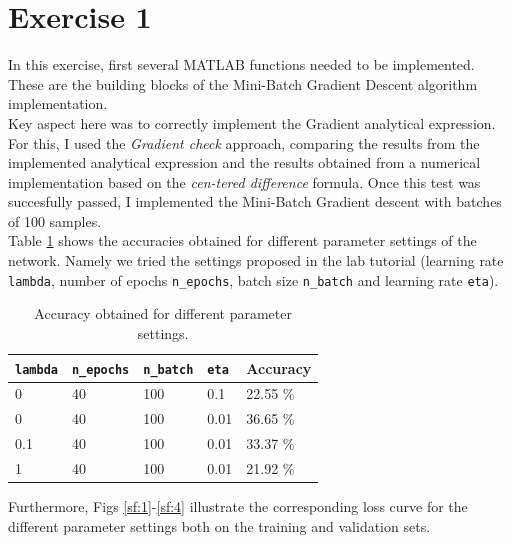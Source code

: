\documentclass[journal, a4paper]{IEEEtran}
\begin{document}
\section{Exercise 1} \label{sec:1}

In this exercise, first several MATLAB functions needed to be implemented. These are the building blocks of the Mini-Batch Gradient Descent algorithm implementation.\\

Key aspect here was to correctly implement the Gradient analytical expression. For this, I used the \emph{Gradient check} approach, comparing the results from the implemented analytical expression and the results obtained from a numerical implementation based on the \emph{cen-tered difference} formula. Once this test was succesfully passed, I implemented the Mini-Batch Gradient descent with batches of 100 samples. \\

Table \ref{tab:acc} shows the accuracies obtained for different parameter settings of the network. Namely we tried the settings proposed in the lab tutorial (learning rate \texttt{lambda}, number of epochs \texttt{n\_epochs}, batch size \texttt{n\_batch} and learning rate \texttt{eta}).

\begin{table}[H]
\centering
\caption{Accuracy obtained for different parameter settings.}
\begin{tabular}{l l l l l}
\toprule
\textbf{\texttt{lambda}} & \textbf{\texttt{n\_epochs}} & \textbf{\texttt{n\_batch}} & \textbf{\texttt{eta}} & \textbf{Accuracy}\\
\midrule
0  &  40 & 100 & 0.1 & 22.55 \%\\
0 & 40 & 100 & 0.01 & 36.65 \%  \\
0.1 & 40 & 100 & 0.01 & 33.37 \% \\
1 & 40 & 100 & 0.01 & 21.92 \%\\
\bottomrule
\end{tabular}
\label{tab:acc}
\end{table}


Furthermore, Figs \ref{sf:1}-\ref{sf:4} illustrate the corresponding loss curve for the different parameter settings both on the training and validation sets.
\end{document}
